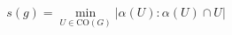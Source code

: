 \documentclass[preview]{standalone}
\begin{document}
\begin{align*}
s(g) = \min_{U \in \mathrm{CO}(G)}\left|\alpha(U) : \alpha(U) \cap U\right|
\end{align*}
\end{document}
